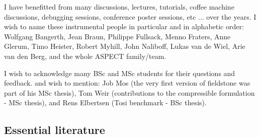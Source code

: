 \documentclass[a4paper]{article}
\begin{document}
I have benefitted from many discussions, lectures, tutorials, coffee machine 
discussions, debugging sessions, conference poster sessions, etc ... 
over the years. I wish to name these instrumental people in particular and 
in alphabetic order: 
Wolfgang Bangerth, 
Jean Braun, 
Philippe Fullsack, 
Menno Fraters, 
Anne Glerum,
Timo Heister,
Robert Myhill,
John Naliboff,
Lukas van de Wiel,
Arie van den Berg, and the whole ASPECT family/team. 

I wish to acknowledge many BSc and MSc students for their questions and feedback.
and wish to mention: Job Mos (the
very first version of fieldstone was part of his MSc thesis), 
Tom Weir (contributions to the compressible formulation - MSc thesis), 
and Rens Elbertsen (Tosi benchmark - BSc thesis).



\subsection{Essential literature} %
\end{document}
